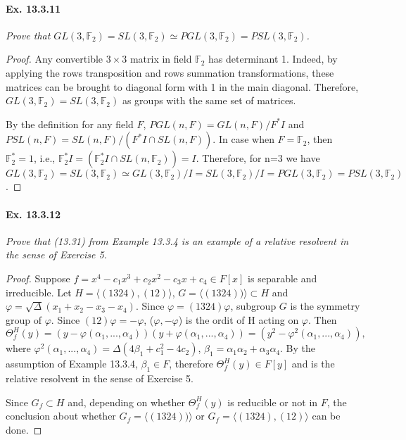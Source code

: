 \documentclass[11pt,a4paper]{article}
\begin{document}
\paragraph{Ex. 13.3.11}

{\it Prove that  $GL(3,\mathbb{F}_2)=SL(3,\mathbb{F}_2) \simeq PGL(3,\mathbb{F}_2)=PSL(3,\mathbb{F}_2)$. 

\begin{proof}
Any convertible $3\times 3$ matrix in field $\mathbb{F}_2$ has determinant 1. Indeed, by applying the rows transposition and rows summation transformations, these matrices can be brought to diagonal form with 1 in the main diagonal. Therefore, $GL(3,\mathbb{F}_2)=SL(3,\mathbb{F}_2)$ as groups with the same set of matrices.

By the definition for any field $F$, $PGL(n,F)=GL(n,F)/F^*I$ and $PSL(n,F)=SL(n,F)/(F^*I\cap SL(n,F))$. In case when $F=\mathbb{F}_2$, then $\mathbb{F}_2^*=1$, i.e., $\mathbb{F}_2^*I=(\mathbb{F}_2^*I\cap SL(n,\mathbb{F}_2))=I$. Therefore, for n=3 we have $GL(3,\mathbb{F}_2)=SL(3,\mathbb{F}_2) \simeq GL(3,\mathbb{F}_2)/I=SL(3,\mathbb{F}_2)/I=PGL(3,\mathbb{F}_2)=PSL(3,\mathbb{F}_2)$.
\end{proof}
}

\paragraph{Ex. 13.3.12}

{\it Prove that  (13.31) from Example 13.3.4 is an example of a relative resolvent in the sense of Exercise 5. 

\begin{proof}
Suppose $f=x^4-c_1x^3+c_2x^2-c_3x+c_4 \in F[x]$ is separable and irreducible.
Let $H=\langle (1324),(12) \rangle$,  $G=\langle (1324)) \rangle \subset H$ and $\varphi=\sqrt{\Delta}(x_1+x_2-x_3-x_4)$. Since $\varphi=(1324)\varphi$, subgroup $G$ is the symmetry group of $\varphi$. Since $(12)\varphi=-\varphi$,  ($\varphi,-\varphi$) is the ordit of H acting on $\varphi$.  Then $$\Theta_f^H(y)=( y - \varphi(\alpha_1,...,\alpha_4))( y + \varphi(\alpha_1,...,\alpha_4))=( y^2 - \varphi^2(\alpha_1,...,\alpha_4)),$$
where $\varphi^2(\alpha_1,...,\alpha_4)=\Delta(4\beta_1+c_1^2-4c_2)$, $\beta_1=\alpha_1\alpha_2+\alpha_3\alpha_4$. By the assumption of Example 13.3.4, $\beta_1 \in F$, therefore $\Theta_f^H(y) \in F[y]$ and is the relative resolvent in the sense of Exercise 5. 

Since $G_f \subset H$ and, depending on whether $\Theta_f^H(y)$ is reducible or not in $F$, the conclusion about whether $G_f=\langle (1324)) \rangle$ or $G_f=\langle (1324),(12) \rangle$ can be done.  

\end{proof}
}
\end{document}
